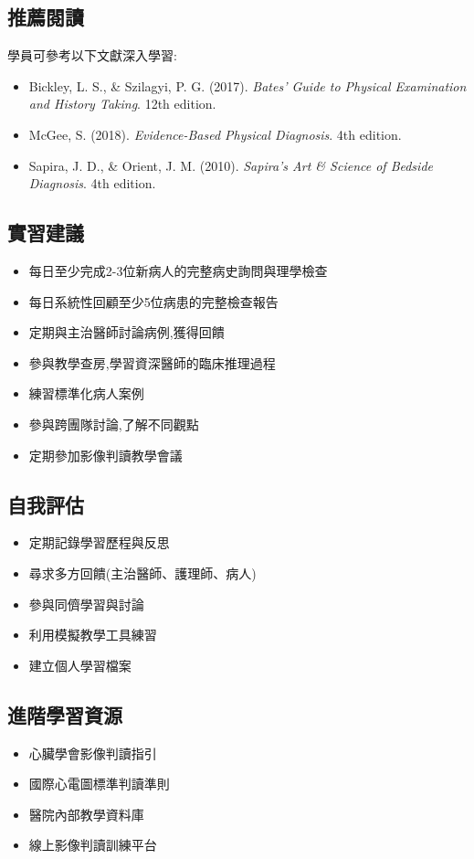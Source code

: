 \documentclass[12pt,a4paper]{article}
\begin{document}
\subsection{推薦閱讀}
學員可參考以下文獻深入學習:
\begin{itemize}
    \item Bickley, L. S., \& Szilagyi, P. G. (2017). \textit{Bates' Guide to Physical Examination and History Taking}. 12th edition.
    \item McGee, S. (2018). \textit{Evidence-Based Physical Diagnosis}. 4th edition.
    \item Sapira, J. D., \& Orient, J. M. (2010). \textit{Sapira's Art \& Science of Bedside Diagnosis}. 4th edition.
\end{itemize}

\subsection{實習建議}
\begin{itemize}[nosep]
    \item 每日至少完成2-3位新病人的完整病史詢問與理學檢查
    \item 每日系統性回顧至少5位病患的完整檢查報告
    \item 定期與主治醫師討論病例,獲得回饋
    \item 參與教學查房,學習資深醫師的臨床推理過程
    \item 練習標準化病人案例
    \item 參與跨團隊討論,了解不同觀點
    \item 定期參加影像判讀教學會議
\end{itemize}

\subsection{自我評估}
\begin{itemize}[nosep]
    \item 定期記錄學習歷程與反思
    \item 尋求多方回饋(主治醫師、護理師、病人)
    \item 參與同儕學習與討論
    \item 利用模擬教學工具練習
    \item 建立個人學習檔案
\end{itemize}

\subsection{進階學習資源}
\begin{itemize}[nosep]
    \item 心臟學會影像判讀指引
    \item 國際心電圖標準判讀準則
    \item 醫院內部教學資料庫
    \item 線上影像判讀訓練平台
\end{itemize}
\end{document}
